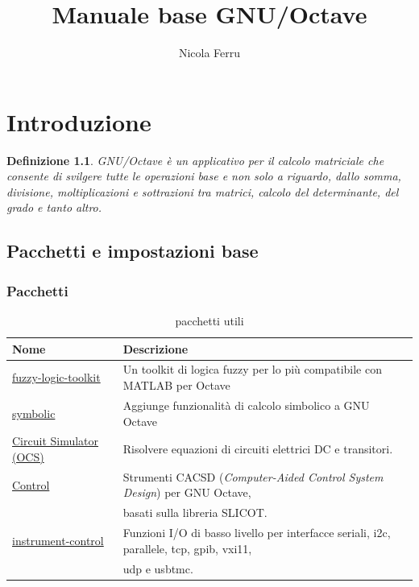\documentclass{book}
\title{Manuale base GNU/Octave}
\author{Nicola Ferru}
\newtheorem{defi}{Definizione}
\begin{document}
\maketitle
\tableofcontents
\chapter{Introduzione}
\label{chap:intro}
\begin{defi}
  GNU/Octave è un applicativo per il calcolo matriciale che consente di svilgere
  tutte le operazioni base e non solo a riguardo, dallo somma, divisione,
  moltiplicazioni e sottrazioni tra matrici, calcolo del determinante, del
  grado e tanto altro.
\end{defi}

\section{Pacchetti e impostazioni base}
\label{sec:packbase}

\subsection{Pacchetti}
\label{sec:pack}

\begin{table}[th]
  \centering
  \begin{tabular}{ll}
    {\bf Nome} & {\bf Descrizione}\\\hline
    \href{https://gnu-octave.github.io/packages/fuzzy-logic-toolkit/}{fuzzy-logic-toolkit} & Un toolkit di logica fuzzy per lo più
                                                                                               compatibile con MATLAB per Octave \\\hline
    \href{https://gnu-octave.github.io/packages/symbolic/}{symbolic} & Aggiunge funzionalità di calcolo simbolico a GNU
                        Octave \\\hline
    \href{https://gnu-octave.github.io/packages/ocs/}{Circuit Simulator (OCS)} & Risolvere equazioni di circuiti elettrici DC e transitori. \\\hline
    \href{https://gnu-octave.github.io/packages/control/}{Control} & Strumenti CACSD ({\it Computer-Aided Control System
                       Design}) per GNU Octave,\\ &basati sulla libreria SLICOT.\\\hline
    \href{https://gnu-octave.github.io/packages/instrument-control/}{instrument-control} & Funzioni I/O di basso livello per interfacce seriali, i2c, parallele, tcp, gpib, vxi11,\\
               &udp e usbtmc.\\\hline 
  \end{tabular}
  \caption{pacchetti utili}
  \label{tab:pachutil}
\end{table}
\end{document}
